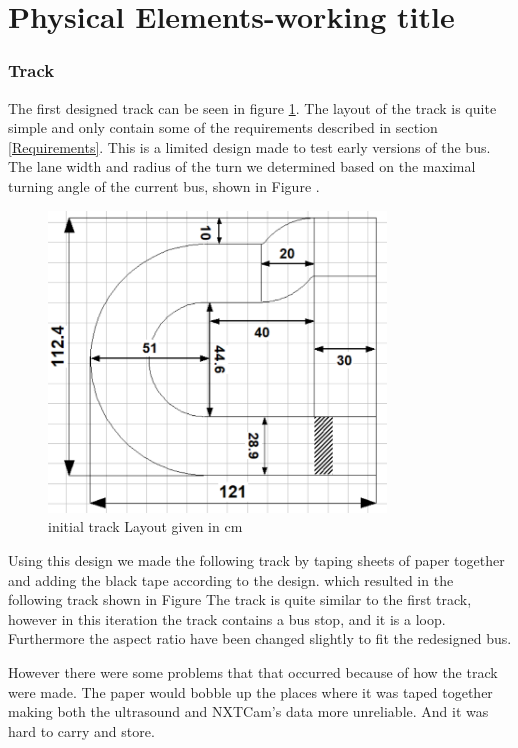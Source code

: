 \section{Physical Elements-working title}

\subsubsection{Track}
The first designed track can be seen in figure \ref{Track1Layout}. The layout of the track is quite simple and only contain some of the requirements described in section \ref{Requirements}. This is a limited design made to test early versions of the bus. The lane width and radius of the turn we determined based on the maximal turning angle of the current bus, shown in Figure .

\begin{figure}[H]
    \label{Track1Layout}
    \centering
    \includegraphics[width=0.8\textwidth]{Images/Tracks/Track1.PNG}
    \caption{initial track Layout given in cm}
\end{figure}

Using this design we made the following track by taping sheets of paper together and adding the black tape according to the design. which resulted in the following track shown in Figure 
The track is quite similar to the first track, however in this iteration the track contains a bus stop, and it is a loop. Furthermore the aspect ratio have been changed slightly to fit the redesigned bus.


However there were some problems that that occurred because of how the track were made. The paper would bobble up the places where it was taped together making both the ultrasound and NXTCam's data more unreliable. And it was hard to carry and store.

